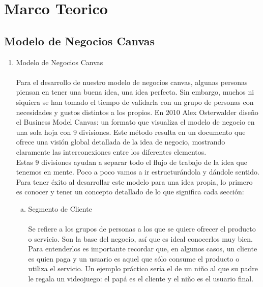  \section{Marco Teorico} 
\subsection{Modelo de Negocios Canvas}
\begin{enumerate}[1.]
	
	\item Modelo de Negocios Canvas
	\\
	\\
	 Para el desarrollo de nuestro modelo de negocios canvas, algunas personas piensan en tener una buena idea, una idea perfecta. Sin embargo, muchos ni siquiera se han tomado el tiempo de validarla con un grupo de personas con necesidades y gustos distintos a los propios. En 2010 Alex Osterwalder diseño el Business Model Canvas: un formato que visualiza el modelo de negocio en una sola hoja con 9 divisiones. Este método resulta en un documento que ofrece una visión global detallada de la idea de negocio, mostrando claramente las interconexiones entre los diferentes elementos.\\
Estas 9 divisiones ayudan a separar todo el flujo de trabajo de la idea que tenemos en mente. Poco a poco vamos a ir estructurándola y dándole sentido. Para tener éxito al desarrollar este modelo para una idea propia, lo primero es conocer y tener un concepto detallado de lo que significa cada sección:\\
		\begin{enumerate}[a)]
			\item Segmento de Cliente \\
			\\
			Se refiere a los grupos de personas a los que se quiere ofrecer el producto o servicio. Son la base del negocio, así que es ideal conocerlos muy bien. Para entenderlos es importante recordar que, en algunos casos, un cliente es quien paga y un usuario es aquel que sólo consume el producto o utiliza el servicio. Un ejemplo práctico sería el de un niño al que su padre le regala un videojuego: el papá es el cliente y el niño es el usuario final.\\


\end{enumerate}
\end{enumerate}
